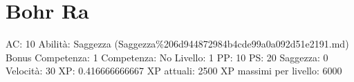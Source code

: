 \section{Bohr Ra}\label{bohr-ra}

AC: 10 Abilità: Saggezza
(Saggezza\%206d944872984b4cde99a0a092d51e2191.md) Bonus Competenza: 1
Competenza: No Livello: 1 PP: 10 PS: 20 Saggezza: 0 Velocità: 30 XP:
0.416666666667 XP attuali: 2500 XP massimi per livello: 6000
